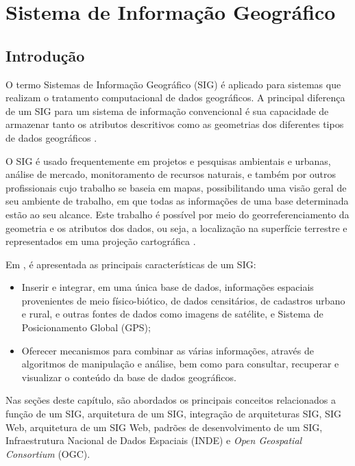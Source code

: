 \chapter{Sistema de Informação Geográfico}
\label{cap:sig}

\section{Introdução}

O termo Sistemas de Informação Geográfico (SIG) é aplicado para sistemas que realizam o tratamento computacional de dados geográficos. A principal diferença de um SIG para um sistema de informação convencional é sua capacidade de armazenar tanto os atributos descritivos como as geometrias dos diferentes tipos de dados geográficos \cite{camara}.

O SIG é usado frequentemente em projetos e pesquisas ambientais e urbanas, análise de mercado, monitoramento de recursos naturais, e também por outros profissionais cujo trabalho se baseia em mapas, possibilitando uma visão geral de seu ambiente de trabalho, em que todas as informações de uma base determinada estão ao seu alcance. Este trabalho é possível por meio do georreferenciamento da geometria e os atributos dos dados, ou seja, a localização na superfície terrestre e representados em uma projeção cartográfica \cite{websisbra}.

Em , é apresentada as principais características de um SIG:

\begin{itemize}
\item Inserir e integrar, em uma única base de dados, informações espaciais provenientes de meio físico-biótico, de dados censitários, de cadastros urbano e rural, e outras fontes de dados como imagens de satélite, e  Sistema de Posicionamento Global (GPS);
\item Oferecer mecanismos para combinar as várias informações, através de algoritmos de manipulação e análise, bem como para consultar, recuperar e visualizar o conteúdo da base de dados geográficos.
\end{itemize}

Nas seções deste capítulo, são abordados os principais conceitos relacionados a função de um SIG, arquitetura de um SIG, integração de arquiteturas SIG, SIG Web, arquitetura de um SIG Web, padrões de desenvolvimento de um SIG, Infraestrutura Nacional de Dados Espaciais (INDE) e \textit{Open Geospatial Consortium} (OGC).

